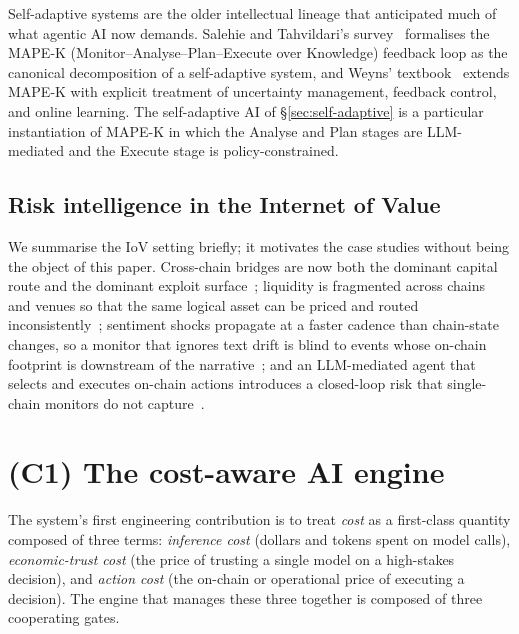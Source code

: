 \documentclass[11pt,a4paper]{article}
\begin{document}
Self-adaptive systems are the older intellectual lineage that
anticipated much of what agentic AI now demands. Salehie and
Tahvildari's survey~\cite{salehie2009self} formalises the MAPE-K
(Monitor--Analyse--Plan--Execute over Knowledge) feedback loop as the
canonical decomposition of a self-adaptive system, and Weyns'
textbook~\cite{weyns2020introduction} extends MAPE-K with explicit
treatment of uncertainty management, feedback control, and online
learning. The self-adaptive AI of \S\ref{sec:self-adaptive} is a
particular instantiation of MAPE-K in which the Analyse and Plan stages
are LLM-mediated and the Execute stage is policy-constrained.

\subsection{Risk intelligence in the Internet of Value}\label{sec:bg:iov}

We summarise the IoV setting briefly; it motivates the case studies
without being the object of this paper. Cross-chain bridges are now both
the dominant capital route and the dominant exploit
surface~\cite{augusto2024sok,wu2025safeguarding,chainalysis2022bridges};
liquidity is fragmented across chains and venues so that the same
logical asset can be priced and routed
inconsistently~\cite{zhang2023sok,palaiokrassas2023multichain,gogol2024liquidity};
sentiment shocks propagate at a faster cadence than chain-state changes,
so a monitor that ignores text drift is blind to events whose on-chain
footprint is downstream of the
narrative~\cite{schumaker2009textual,xing2018natural,day2016deep,zhang2025sentistack};
and an LLM-mediated agent that selects and executes on-chain actions
introduces a closed-loop risk that single-chain monitors do not
capture~\cite{wang2024survey,bai2022constitutional}.

\section{(C1) The cost-aware AI engine}\label{sec:cost-aware}

The system's first engineering contribution is to treat \emph{cost} as a
first-class quantity composed of three terms: \emph{inference cost}
(dollars and tokens spent on model calls), \emph{economic-trust cost}
(the price of trusting a single model on a high-stakes decision), and
\emph{action cost} (the on-chain or operational price of executing a
decision). The engine that manages these three together is composed of
three cooperating gates.
\end{document}
